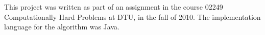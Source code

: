 
This project was written as part of an assignment in the
course 02249 Computationally Hard Problems at DTU, in the fall
of 2010. The implementation language for the algorithm was Java.

